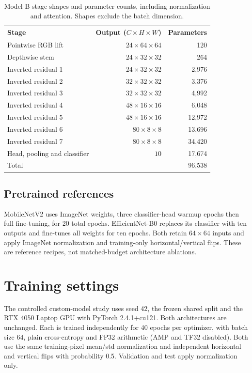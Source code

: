 \documentclass[11pt,a4paper]{article}
\begin{document}
\begin{table}[htbp]\centering\small
\caption{Model B stage shapes and parameter counts, including normalization and attention. Shapes exclude the batch dimension.}\label{tab:b-stages}
\begin{tabular}{lrr}
\toprule Stage & Output ($C\times H\times W$) & Parameters \\
\midrule
Pointwise RGB lift & $24\times64\times64$ & 120 \\
Depthwise stem & $24\times32\times32$ & 264 \\
Inverted residual 1 & $24\times32\times32$ & 2,976 \\
Inverted residual 2 & $32\times32\times32$ & 3,376 \\
Inverted residual 3 & $32\times32\times32$ & 4,992 \\
Inverted residual 4 & $48\times16\times16$ & 6,048 \\
Inverted residual 5 & $48\times16\times16$ & 12,972 \\
Inverted residual 6 & $80\times8\times8$ & 13,696 \\
Inverted residual 7 & $80\times8\times8$ & 34,420 \\
Head, pooling and classifier & $10$ & 17,674 \\
\midrule Total & & 96,538 \\
\bottomrule\end{tabular}
\end{table}
\subsection{Pretrained references}
MobileNetV2 \cite{sandler} uses ImageNet weights, three classifier-head warmup epochs then full fine-tuning, for 20 total epochs. EfficientNet-B0 \cite{tan} replaces its classifier with ten outputs and fine-tunes all weights for ten epochs. Both retain $64\times64$ inputs and apply ImageNet normalization and training-only horizontal/vertical flips. These are reference recipes, not matched-budget architecture ablations.

\section{Training settings}
The controlled custom-model study uses seed 42, the frozen shared split and the RTX 4050 Laptop GPU with PyTorch 2.4.1+cu121. Both architectures are unchanged. Each is trained independently for 40 epochs per optimizer, with batch size 64, plain cross-entropy and FP32 arithmetic (AMP and TF32 disabled). Both use the same training-pixel mean/std normalization and independent horizontal and vertical flips with probability 0.5. Validation and test apply normalization only.
\end{document}
